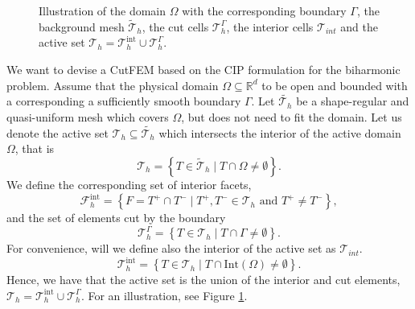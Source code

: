 \documentclass[11pt]{article}
\theoremstyle{remark}
\numberwithin{equation}{section}
\begin{document}
\begin{figure}[h!]
{


}


\caption{Illustration of the domain $\Omega$ with the corresponding boundary $\Gamma$, the background mesh $\widetilde{\mathcal{T}}_{h} $,  the cut cells $\mathcal{T}_{h} ^{\Gamma }$, the interior cells $\mathcal{T} _{int}$ and the active set $\mathcal{T} _{h} =
\mathcal{T}^{ \mathrm{int}  }_{h} \cup \mathcal{T}_{h }^{ \Gamma  }  $. }
\label{fig:background_mesh}
\end{figure}


We want to devise a CutFEM based on the CIP formulation for the biharmonic problem. Assume that the physical domain $\Omega \subseteq    \mathbb{R} ^d$ to be open and bounded with a corresponding a sufficiently smooth boundary $\Gamma  $.
 Let $\widetilde{\mathcal{T}_{h} } $ be a shape-regular and quasi-uniform mesh which covers $\Omega $, but does not need to fit the
domain. Let us denote the active set $\mathcal{T} _{h} \subseteq \widetilde{\mathcal{T}_{h}}$ which intersects the interior of the active domain $\Omega $, that is
\begin{equation}
\label{eq:active_set}
\mathcal{T} _{h} = \left\{ T \in \widetilde{\mathcal{T} }_{h}  \mid  T \cap \Omega   \neq \emptyset    \right\}.
\end{equation}
We define the corresponding set of interior facets, \[
    \mathcal{F} _{h}^{\mathrm{int} } = \left\{ F = T^{+} \cap T^{-}  \mid  T^{+}, T^{-} \in \mathcal{T} _{h} \text{ and } T^{+} \neq T^{-} \right\},
\]
and the set of elements cut by the boundary \[
\mathcal{T}_{h} ^{\Gamma } = \left\{ T \in \mathcal{T} _{h}   \mid  T \cap \Gamma \neq \emptyset  \right\}.
\]
For convenience, will we define also the interior of the active set as $\mathcal{T} _{int}$.
\[
\mathcal{T} ^{\mathrm{int} }_{h} = \left\{ T \in \mathcal{T} _{h}   \mid  T \cap  \mathrm{Int}(\Omega ) \neq \emptyset  \right\}.
\]
Hence, we have that the active set is the union of the interior and cut elements, $\mathcal{T} _{h} = \mathcal{T}_{h} ^{\mathrm{int} } \cup  \mathcal{T} ^{\Gamma }_{h}$. For an illustration, see Figure \ref{fig:background_mesh}.
\end{document}
